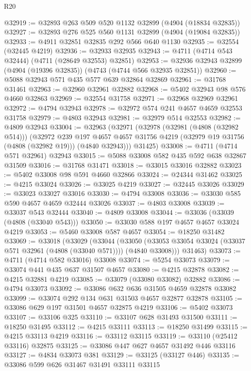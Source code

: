 \begin{lexlean}{R20}
\begin{coremodule}
@32919 := @32893 @263 @509 @520 @1132 @32899 (@4904 (@18834 @32835))
@32927 := @32893 @276 @525 @560 @1131 @32899 (@4904 (@19084 @32835))
@32933 := @4911 @32851 @32835 @292 @566 @640 @1130
@32935 := @32554 (@32445 @4219)
@32936 := @32933 @32935
@32943 := @4711 (@4714 @543 @32444) (@4711 (@28649 @32553) @32851)
@32953 := @32936 @32943 @32899 (@4904 (@19396 @32835)) (@4743 (@4744 @566 @32935 @32851))
@32960 := @5088 @32943 @571 @435 @577 @639 @32864 @32869
@32961 := @31768 @31461
@32963 := @32960 @32961 @32882
@32968 := @5402 @32943 @98 @576 @4660 @32863
@32969 := @32554 @31758
@32971 := @32968 @32969 @32961
@32972 := @4794 @32943
@32978 := @32972 @574 @241 @4657 @4659 @32553 @31758
@32979 := @4803 @32943
@32981 := @32979 @514 @32553
@32982 := @4809 @32943
@33004 := @32963
    (@32971
      (@32978
        (@32981 (@4808 (@32982 @514)))
        (@32972
          @239
          @197
          @4657
          @4657
          @31756
          @4219
          (@32979 @19 @31756 (@4808 (@32982 @19)))
          (@4840 @32943)))
      @31425)
@33008 := @4711 (@4714 @571 @32961) @32943
@33015 := @5088 @33008 @582 @435 @592 @638 @32867 @31509
@33016 := @31768 @31471
@33018 := @33015 @33016 @32882
@33023 := @5402 @33008 @98 @591 @4660 @32866
@33024 := @24344 @31462
@33025 := @4215 @33024
@33026 := @33025 @4219
@33027 := @32445 @33026
@33029 := @33023 @33027 @33016
@33030 := @4794 @33008
@33036 := @33030 @585 @590 @4657 @4659 @32444 @33026
@33037 := @4803 @33008
@33039 := @33037 @543 @32444
@33040 := @4809 @33008
@33044 := @33036 (@33039 (@4808 (@33040 @543)))
@33050 := @33030 @588 @197 @4657 @4657 @33024 @4219
@33053 := @5460 @33008 @587 @4657
@33054 := @18250 @31482
@33069 := @33018
    (@33029
      (@33044
        (@33050 (@33053 @33054 @33024 (@33037 @571 @32961 (@4808 (@33040 @571)))) (@4840 @33008)))
      @31463)
@33073 := @4711 (@4714 @582 @33016) @33008
@33074 := @5254 @33073
@33079 := @33074 @441 @435 @637 @31507 @4657
@33080 := @4215 @32878
@33082 := @4215 @32881 @4219
@33085 := @33079 (@33080 @33082) @32882
@33086 := @4794 @33073
@33092 := @33086 @632 @636 @31505 @4659 @32878 @33082
@33099 := @33074 @292 @134 @631 @31503 @4657 @32877 @32878
@33105 := @33086 @629 @197 @31501 @4657 @32875 @4219
@33106 := @5402 @33073
@33107 := @33106 @325
@33110 := @33107 @628 @31493 @31500
@33111 := @18250 @31495
@33112 := @4215 @33111
@33113 := @18250 @31499
@33115 := @4215 @33113 @4219
@33116 := @33112 @33115
@33119 := @33110 (@25412 @33116) @32875
@33125 := @33086 @447 @627 @4657 @31492 @446 @33116
@33127 := @4834 @33073 @381
@33129 := @33125 (@33127 @446)
@33135 := @33086 @599 @626 @31467 @31491 @33111 @33115

\end{coremodule}
\end{lexlean}
